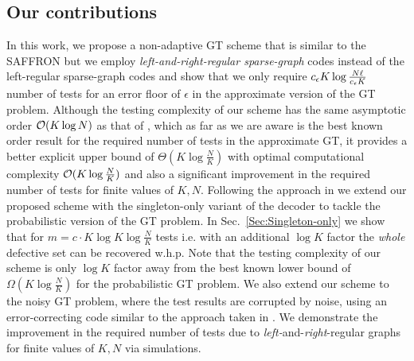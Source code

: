 \subsection*{Our contributions}
In this work, we propose a non-adaptive GT scheme that is similar to the SAFFRON but we employ \textit{left-and-right-regular sparse-graph} codes instead of the left-regular sparse-graph codes and show that we only require $c_{\epsilon} K\log \frac{N\ell}{c_{\epsilon} K}$ number of tests for an error floor of $\epsilon$ in the approximate version of the GT problem. Although the testing complexity of our scheme has the same asymptotic order $\mathcal{O}(K\log N)$ as that of \cite{lee2015saffron}, which as far as we are aware is the best known order result for the required number of tests in the approximate GT, it provides a better explicit upper bound of $\Theta(K\log \frac{N}{K})$ with optimal computational complexity $\mathcal{O}(K\log \frac{N}{K})$ and also a significant improvement in the required number of tests for finite values of $K,N$. 
Following the approach in \cite{lee2015saffron} we extend our proposed scheme with the singleton-only variant of the decoder to tackle the probabilistic version of the GT problem. In Sec.~\ref{Sec:Singleton-only} we show that for $m=c\cdot K\log K \log \frac{N}{K}$ tests i.e. with an additional $\log K$ factor the \textit{whole} defective set can be recovered w.h.p. Note that the testing complexity of our scheme is only $\log K$ factor away from the best known lower bound of $\Omega(K\log \frac{N}{K})$ \cite{chan2014non} for the probabilistic GT problem. We also extend our scheme to the noisy GT problem, where the test results are corrupted by noise, using an error-correcting code similar to the approach taken in \cite{lee2015saffron}. We demonstrate the improvement in the required number of tests due to \emph{left-}and-\emph{right}-regular graphs  for finite values of $K, N$ via simulations.
